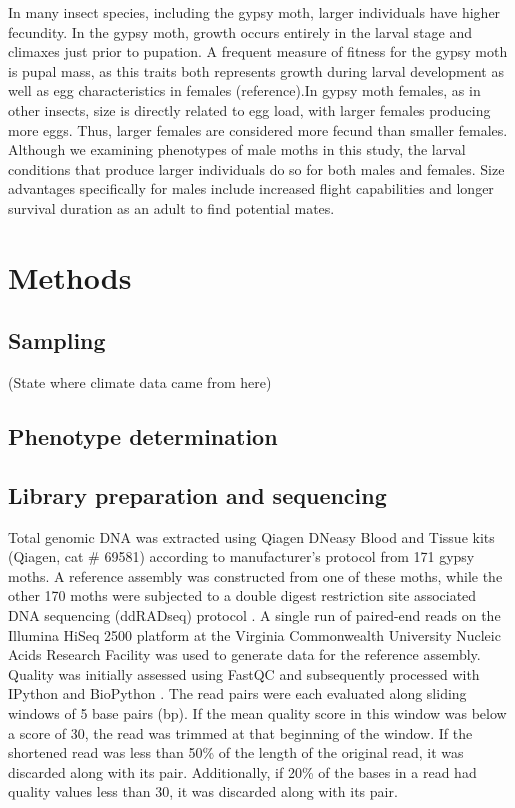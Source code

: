 \documentclass[smallextended]{svjour3}
\begin{document}
In many insect species, including the gypsy moth, larger individuals have higher
fecundity. In the gypsy moth, growth occurs entirely in the larval stage and
climaxes just prior to pupation. A frequent measure of fitness for the gypsy
moth is pupal mass, as this traits both represents growth during larval
development as well as egg characteristics in females (reference).In gypsy moth
females, as in other insects, size is directly related to egg load, with larger
females producing more eggs. Thus, larger females are considered more fecund
than smaller females. Although we examining phenotypes of male moths in this
study, the larval conditions that produce larger individuals do so for both
males and females. Size advantages specifically for males include increased
flight capabilities and longer survival duration as an adult to find potential
mates.


\section*{Methods}

\subsection*{Sampling}

(State where climate data came from here)

\subsection*{Phenotype determination}

\subsection*{Library preparation and sequencing}

Total genomic DNA was extracted using Qiagen DNeasy Blood and Tissue kits (Qiagen, cat \# 69581)
according to manufacturer's protocol from 171 gypsy moths. A reference assembly was constructed
from one of these moths, while the other 170 moths were subjected to a double digest restriction site
associated DNA sequencing (ddRADseq) protocol \citep{PARCHMAN:2012ca}.
A single run of paired-end reads on the Illumina HiSeq 2500 platform at the
Virginia Commonwealth University Nucleic Acids Research Facility was used to generate
data for the reference assembly. Quality was initially assessed using 
FastQC \citep{fastqc} and subsequently processed with
IPython \citep{Perez:2007hy} and BioPython \citep{Cock:2009hj}. The read pairs
were each evaluated along sliding windows of 5 base pairs (bp).  If the mean
quality score in this window was below a score of 30, the read was trimmed at that
beginning of the window. If the shortened read was less than 50\% of the length
of the original read, it was discarded along with its pair. Additionally, if
20\% of the bases in a read had quality values less than 30, it was discarded
along with its pair.
\end{document}
